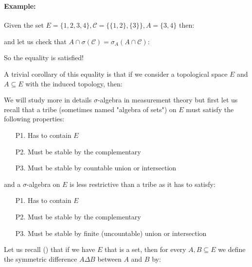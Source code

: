 	\begin{tcolorbox}[colframe=black,colback=white,sharp corners]
	\textbf{{\Large {}}Example:}\\\\
	Given the set $E=\{1,2,3,4\},\mathcal{C}=\{\{1,2\},\{3\}\},A=\{3,4\}$ then:
	
	and let us check that $A\cap \sigma(\mathcal{C})=\sigma_A(A\cap \mathcal{C})$:
	
	So the equality is satisfied!
	\end{tcolorbox}
	A trivial corollary of this equality is that if we consider a topological space $ E$ and $A\subseteq E$ with the induced topology, then:
	
	We will study more in details $\sigma$-algebra in measurement theory but first let us recall that a tribe (sometimes named "algebra of sets") on $E$ must satisfy the following properties:
	\begin{enumerate}
		\item[P1.] Has to contain $E$
		\item[P2.] Must be stable by the complementary
		\item[P3.] Must be stable by countable union or intersection
	\end{enumerate}
	and a $\sigma$-algebra on $E$ is less restrictive than a tribe as it has to satisfy:
	\begin{enumerate}
		\item[P1.] Has to contain $E$
		\item[P2.] Must be stable by the complementary
		\item[P3.] Must be stable by finite (uncountable) union or intersection
	\end{enumerate}
	Let us recall () that if we have $E$ that is a set, then for every $A,B\subseteq E$ we define the symmetric difference $A\Delta B$ between $A$ and $B$ by:
	
